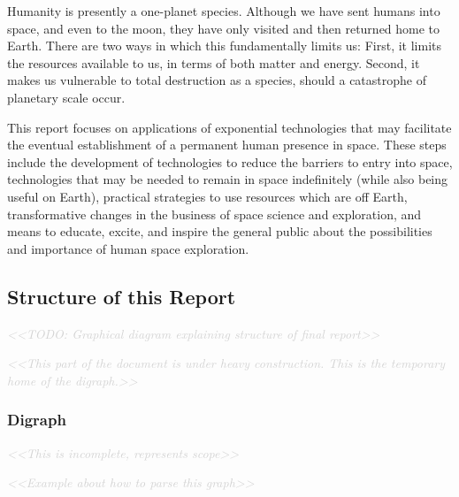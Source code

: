 \documentclass[letter,11pt]{article}
\newcommand{\todo}[1]{\textcolor{lightgray}{\textit{<<#1>>}}}
\begin{document}
Humanity is presently a one-planet species. Although we have sent
humans into space, and even to the moon, they have only visited and
then returned home to Earth. There are two ways in which this
fundamentally limits us: First, it limits the resources available to
us, in terms of both matter and energy. Second, it makes us vulnerable
to total destruction as a species, should a catastrophe of planetary
scale occur.

This report focuses on applications of exponential technologies that may
facilitate the eventual establishment of a permanent human presence in space.
These steps include the development of technologies to reduce the barriers to
entry into space, technologies that may be needed to remain in space
indefinitely (while also being useful on Earth), practical strategies to use
resources which are off Earth, transformative changes in the business of space
science and exploration, and means to educate, excite, and inspire the general
public about the possibilities and importance of human space exploration.

\subsection{Structure of this Report}

\todo{TODO: Graphical diagram explaining structure of final report}

\todo{This part of the document is under heavy construction. This is the temporary home of the digraph.}

\subsubsection{Digraph}

\todo{This is incomplete, represents scope}

\todo{Example about how to parse this graph}
\end{document}
